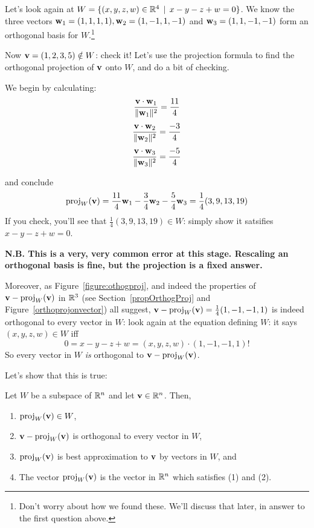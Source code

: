 \begin{myexample}
Let's look again at $W=\{(x,y,z,w) \in \mathbb{R}^4 \,\mid \, x-y-z+w=0 \}$. We know the three vectors  $\mathbf{w}_1=(1,1,1,1), \mathbf{w}_2=(1,-1,1,-1)$ and $ \mathbf{w}_3=(1,1,-1,-1)$ form an orthogonal basis for $W$.\footnote{Don't worry about how we found these.   We'll discuss that later, in answer to the first question  above.}

Now   $\mathbf{v} = (1,2,3,5) \notin W$: check it! Let's use the projection formula to find the orthogonal projection of $\mathbf{v}$ onto $W$, and do a bit of checking.




\begin{mysol}  We begin by calculating:
$$
\frac{\mathbf{v}\cdot \mathbf{w}_1}{\|\mathbf{w}_1\|^2} = \frac{11}{4} 
$$
$$
\frac{\mathbf{v}\cdot \mathbf{w}_2}{\|\mathbf{w}_2\|^2} = \frac{-3}{4} 
$$
$$
\frac{\mathbf{v}\cdot \mathbf{w}_3}{\|\mathbf{w}_3\|^2} = \frac{-5}{4}
$$

and conclude
$$
\operatorname{proj}_W(\mathbf{v}) = \frac{11}4\mathbf{w}_1 - \frac34\mathbf{w}_2 - \frac{5}{4}\mathbf{w}_3=\frac14(3, 9, 13, 19)
$$
 If you check, you'll see that  $\frac14(3, 9, 13, 19)\in W$: simply show it satsifies $x-y-z+w=0$. 

{\bf N.B.  This is a very, very common error at this stage. Rescaling an orthogonal basis is fine, but the projection is a fixed answer.  }

Moreover, as Figure~\ref{figure:othogproj}, and indeed the properties of $\mathbf{v}-\operatorname{proj}_W(\mathbf{v})$ in $\mathbb{R}^3$ (see Section~\ref{propOrthogProj}  and Figure~\ref{orthoprojonvector})
all suggest,  
$\mathbf{v}-\operatorname{proj}_W(\mathbf{v})=\frac14(1, -1, -1, 1)$ is indeed orthogonal to every vector in $W$: look again at the equation defining $W$: it says $(x,y,z,w) \in W$ iff 
$$ 0=x-y-z+w=(x,y,z,w)\cdot(1, -1, -1, 1)!$$So every vector in $W$ {\it is} orthogonal to $\mathbf{v}-\operatorname{proj}_W(\mathbf{v})$.
\end{mysol} 
\end{myexample}

Let's show that this is true:
\begin{theorem}\label{orthogproj}
Let $W$ be a subspace of $\mathbb{R}^n$ and let $\mathbf{v} \in \mathbb{R}^n$. Then,

\begin{enumerate}[(1)]
\item $\operatorname{proj}_W(\mathbf{v}) \in W$,
\item $\mathbf{v} - \operatorname{proj}_W(\mathbf{v})$ is orthogonal to every vector in $W$,
\item $\operatorname{proj}_W(\mathbf{v})$ is best approximation to $\mathbf{v}$ by vectors in $W$, and 
\item The vector $\operatorname{proj}_W(\mathbf{v})$ is the  vector in $\mathbb{R}^n$ which satisfies (1) and (2).
\end{enumerate} 

\end{theorem}

